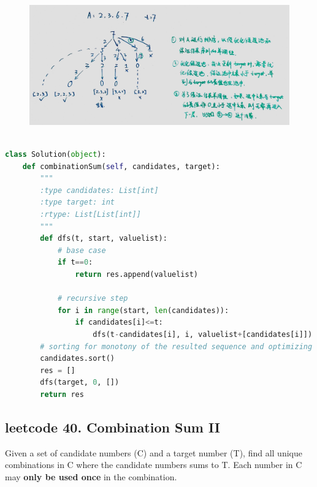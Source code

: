 \documentclass[a4paper,10pt]{article}
\begin{document}

\begin{figure}[h]
    \includegraphics[width=1\textwidth]{leetcode39.jpg}
    \centering\\
\end{figure}

\begin{lstlisting}[language=Python, caption=Problem39. Combination Sum]

class Solution(object):
    def combinationSum(self, candidates, target):
        """
        :type candidates: List[int]
        :type target: int
        :rtype: List[List[int]]
        """
        def dfs(t, start, valuelist):
            # base case
            if t==0:
                return res.append(valuelist)

            # recursive step
            for i in range(start, len(candidates)):
                if candidates[i]<=t:
                    dfs(t-candidates[i], i, valuelist+[candidates[i]])
        # sorting for monotony of the resulted sequence and optimizing the candidate pool
        candidates.sort()
        res = []
        dfs(target, 0, [])
        return res
\end{lstlisting}




\subsection{leetcode 40. Combination Sum II}
Given a set of candidate numbers (C) and a target number (T), find all unique combinations in C where the candidate numbers sums to T. Each number in C may \textbf{only be used once} in the combination. \\
\end{document}
